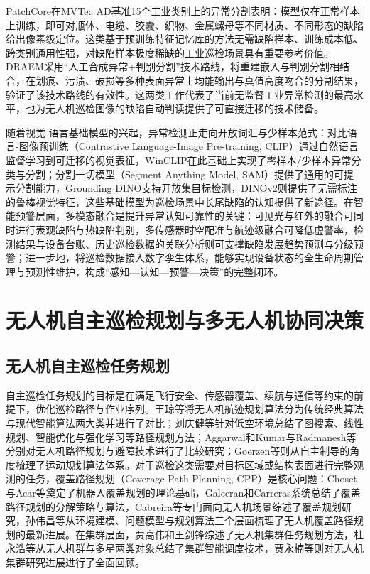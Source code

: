 PatchCore\cite{roth2022towards}在MVTec AD基准\cite{bergmann2019mvtec}15个工业类别上的异常分割表明：模型仅在正常样本上训练，即可对瓶体、电缆、胶囊、织物、金属螺母等不同材质、不同形态的缺陷给出像素级定位。这类基于预训练特征记忆库的方法无需缺陷样本、训练成本低、跨类别通用性强，对缺陷样本极度稀缺的工业巡检场景具有重要参考价值。DRAEM\cite{zavrtanik2021draem}采用“人工合成异常+判别分割”技术路线，将重建嵌入与判别分割相结合，在划痕、污渍、破损等多种表面异常上均能输出与真值高度吻合的分割结果，验证了该技术路线的有效性。这两类工作代表了当前无监督工业异常检测的最高水平，也为无人机巡检图像的缺陷自动判读提供了可直接迁移的技术储备。


随着视觉-语言基础模型的兴起，异常检测正走向开放词汇与少样本范式：对比语言-图像预训练（Contrastive Language-Image Pre-training, CLIP）\cite{radford2021learning}通过自然语言监督学习到可迁移的视觉表征，WinCLIP\cite{jeong2023winclip}在此基础上实现了零样本/少样本异常分类与分割；分割一切模型（Segment Anything Model, SAM）\cite{kirillov2023segment}提供了通用的可提示分割能力，Grounding DINO\cite{liu2024grounding}支持开放集目标检测，DINOv2\cite{oquab2024dinov2}则提供了无需标注的鲁棒视觉特征，这些基础模型为巡检场景中长尾缺陷的认知提供了新途径。在智能预警层面，多模态融合是提升异常认知可靠性的关键：可见光与红外的融合可同时进行表观缺陷与热缺陷判别\cite{jadin2012recent,usamentiaga2014infrared}，多传感器时空配准与航迹级融合可降低虚警率\cite{zengyj2023review,panq2003basic}，检测结果与设备台账、历史巡检数据的关联分析则可支撑缺陷发展趋势预测与分级预警；进一步地，将巡检数据接入数字孪生体系\cite{tao2019digital}，能够实现设备状态的全生命周期管理与预测性维护，构成“感知—认知—预警—决策”的完整闭环。

\section{无人机自主巡检规划与多无人机协同决策}

\subsection{无人机自主巡检任务规划}

自主巡检任务规划的目标是在满足飞行安全、传感器覆盖、续航与通信等约束的前提下，优化巡检路径与作业序列。王琼等\cite{wangq2019overview}将无人机航迹规划算法分为传统经典算法与现代智能算法两大类并进行了对比；刘庆健等\cite{liuqj2023survey}针对低空环境总结了图搜索、线性规划、智能优化与强化学习等路径规划方法；Aggarwal和Kumar与Radmanesh等分别对无人机路径规划与避障技术进行了比较研究；Goerzen等则从自主制导的角度梳理了运动规划算法体系。对于巡检这类需要对目标区域或结构表面进行完整观测的任务，覆盖路径规划（Coverage Path Planning, CPP）是核心问题：Choset\cite{choset2001coverage}与Acar等奠定了机器人覆盖规划的理论基础，Galceran和Carreras\cite{galceran2013survey}系统总结了覆盖路径规划的分解策略与算法，Cabreira等专门面向无人机场景综述了覆盖规划研究，孙伟昌等\cite{sunwc2026review}从环境建模、问题模型与规划算法三个层面梳理了无人机覆盖路径规划的最新进展。在集群层面，贾高伟和王剑锋\cite{jiagw2021review}综述了无人机集群任务规划方法，杜永浩等\cite{duyh2020survey}从无人机群与多星两类对象总结了集群智能调度技术，贾永楠等\cite{jiayn2020recent}则对无人机集群研究进展进行了全面回顾。

